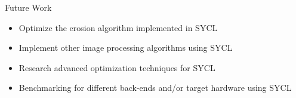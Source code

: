 \begin{frame}{Future Work}
  \begin{itemize}
    \item Optimize the erosion algorithm implemented in SYCL
    \item Implement other image processing algorithms using SYCL
    \item Research advanced optimization techniques for SYCL
    \item Benchmarking for different back-ends and/or target hardware using SYCL
  \end{itemize}
\endblock{}
\end{frame}
